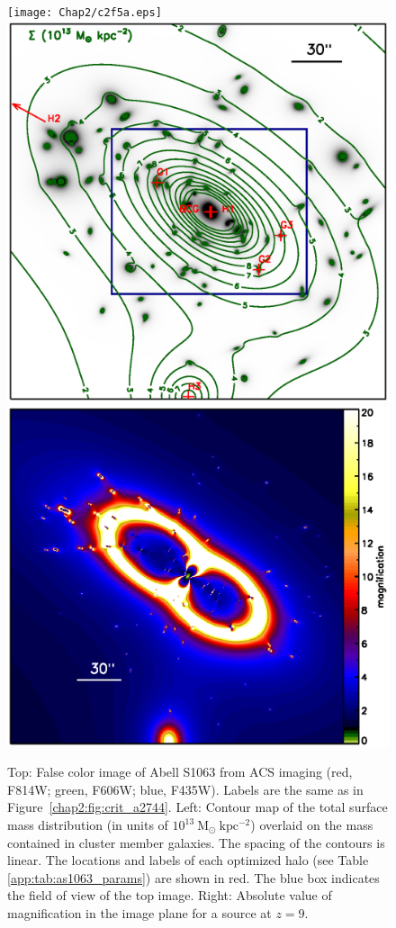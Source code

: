 \begin{figure}[h]
\centering
\texttt{[image: Chap2/c2f5a.eps]} \\
\includegraphics[height=0.28\textheight]{Chap2/c2f5b.eps}
\includegraphics[height=0.28\textheight]{Chap2/c2f5c.eps}
\caption[Abell S1063 image constraints and critical curves]{Top: False color image of Abell S1063 from ACS imaging (red, F814W; green, F606W; blue, F435W).  Labels are the same as in Figure~\ref{chap2:fig:crit_a2744}. Left: Contour map of the total surface mass distribution (in units of $10^{13}\ \mathrm{M_\odot \ kpc^{-2}}$) overlaid on the mass contained in cluster member galaxies. The spacing of the contours is linear. The locations and labels of each optimized halo (see Table \ref{app:tab:as1063_params}) are shown in red. The blue box indicates the field of view of the top image. Right: Absolute value of magnification in the image plane for a source at $z=9$.}
\label{chap2:fig:crit_as1063}
\end{figure}

